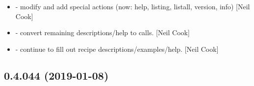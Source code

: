 \documentclass[a4paper,10pt,english]{report}
\begin{document}
\begin{itemize}
\item {} 
 - modify and add special actions (now: \textendash{}help,
\textendash{}listing, \textendash{}listall, \textendash{}version, \textendash{}info) {[}Neil Cook{]}

\item {} 
 - convert remaining descriptions/help to
 calls. {[}Neil Cook{]}

\item {} 
 - continue to fill out recipe
descriptions/examples/help. {[}Neil Cook{]}

\end{itemize}


\subsection{0.4.044 (2019-01-08)}
\end{document}
